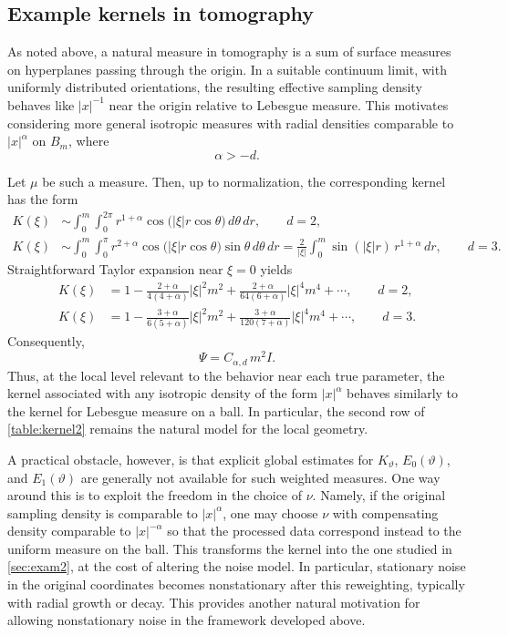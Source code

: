 \documentclass[11pt]{article}
\theoremstyle{definition}
\numberwithin{theorem}{section}
\numberwithin{lemma}{section}
\numberwithin{equation}{section}
\numberwithin{equation}{section}
\begin{document}
\subsection{Example kernels in tomography}
\label{sec:scale}


As noted above, a natural measure in tomography is a sum of surface measures on hyperplanes passing through the origin. In a suitable continuum limit, with uniformly distributed orientations, the resulting effective sampling density behaves like $|x|^{-1}$ near the origin relative to Lebesgue measure. This motivates considering more general isotropic measures with radial densities comparable to $|x|^\alpha$ on $B_m$, where
\[
\alpha>-d.
\]

Let $\mu$ be such a measure. Then, up to normalization, the corresponding kernel has the form
\begin{align*}
K(\xi)
&\sim
\int_0^m \int_0^{2\pi}
r^{1+\alpha}\cos\bigl(|\xi|r\cos\theta\bigr)\,d\theta\,dr,
\qquad d=2,
\\
K(\xi)
&\sim
\int_0^m \int_0^\pi
r^{2+\alpha}\cos\bigl(|\xi|r\cos\theta\bigr)\sin\theta\,d\theta\,dr
=
\frac{2}{|\xi|}
\int_0^m \sin(|\xi|r)\,r^{1+\alpha}\,dr,
\qquad d=3.
\end{align*}
Straightforward Taylor expansion near $\xi=0$ yields
\begin{align*}
K(\xi)
&=
1-\frac{2+\alpha}{4(4+\alpha)}|\xi|^2m^2
+\frac{2+\alpha}{64(6+\alpha)}|\xi|^4m^4+\cdots,
\qquad d=2,
\\
K(\xi)
&=
1-\frac{3+\alpha}{6(5+\alpha)}|\xi|^2m^2
+\frac{3+\alpha}{120(7+\alpha)}|\xi|^4m^4+\cdots,
\qquad d=3.
\end{align*}
Consequently,
\begin{equation}
\label{eq:isotropichessian}
\Psi=C_{\alpha,d}\,m^2 I.
\end{equation}
Thus, at the local level relevant to the behavior near each true parameter, the kernel associated with any isotropic density of the form $|x|^\alpha$ behaves similarly to the kernel for Lebesgue measure on a ball. In particular, the second row of \cref{table:kernel2} remains the natural model for the local geometry.

A practical obstacle, however, is that explicit global estimates for $K_\vartheta$, $E_0(\vartheta)$, and $E_1(\vartheta)$ are generally not available for such weighted measures. One way around this is to exploit the freedom in the choice of $\nu$. Namely, if the original sampling density is comparable to $|x|^\alpha$, one may choose $\nu$ with compensating density comparable to $|x|^{-\alpha}$ so that the processed data correspond instead to the uniform measure on the ball. This transforms the kernel into the one studied in \cref{sec:exam2}, at the cost of altering the noise model. In particular, stationary noise in the original coordinates becomes nonstationary after this reweighting, typically with radial growth or decay. This provides another natural motivation for allowing nonstationary noise in the framework developed above.
\end{document}
